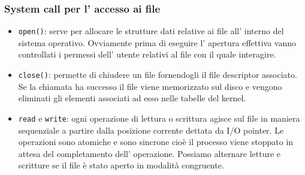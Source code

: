 \subsubsection{System call per l' accesso ai file}
\begin{itemize}
    \item \verb{open(){: serve per allocare le strutture dati relative ai file all' interno del sistema operativo.
    Ovviamente prima di eseguire l' apertura effettiva vanno controllati i permessi dell' utente relativi al file con il quale interagire.
    
    \item \verb{close(){: permette di chiudere un file fornendogli il file descriptor associato.
    Se la chiamata ha successo il file viene memorizzato sul disco e vengono eliminati gli elementi associati ad esso nelle tabelle del kernel.
    
    \item \verb{read{ e \verb{write{: ogni operazione di lettura o scrittura agisce sul file in maniera sequenziale a partire dalla posizione corrente dettata da I/O pointer.
    Le operazioni sono atomiche e sono sincrone cioè il processo viene stoppato in attesa del completamento dell' operazione.
    Possiamo alternare letture e scritture se il file è stato aperto in modalità congruente.
\end{itemize}


